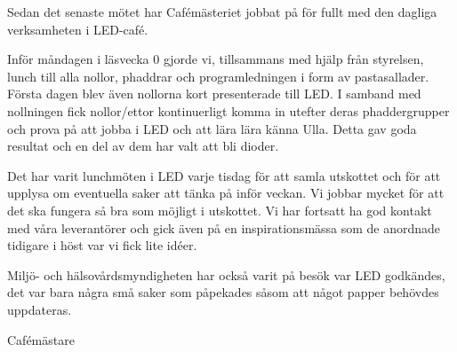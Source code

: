\documentclass[../_main/handlingar.tex]{subfiles}
\begin{document}

Sedan det senaste mötet har Cafémästeriet jobbat på för fullt med den dagliga verksamheten i LED-café.

Inför måndagen i läsvecka 0 gjorde vi, tillsammans med hjälp från styrelsen, lunch till alla nollor, phaddrar och programledningen i form av pastasallader. Första dagen blev även nollorna kort presenterade till LED. I samband med nollningen fick nollor/ettor kontinuerligt komma in utefter deras phaddergrupper och prova på att jobba i LED och att lära lära känna Ulla. Detta gav goda resultat och en del av dem har valt att bli dioder.

Det har varit lunchmöten i LED varje tisdag för att samla utskottet och för att upplysa om eventuella saker att tänka på inför veckan. Vi jobbar mycket för att det ska fungera så bra som möjligt i utskottet. Vi har fortsatt ha god kontakt med våra leverantörer och gick även på en inspirationsmässa som de anordnade tidigare i höst var vi fick lite idéer.

Miljö- och hälsovårdsmyndigheten har också varit på besök var LED godkändes, det var bara några små saker som påpekades såsom att något papper behövdes uppdateras.

\begin{signatures}{1}
    \mvh
    \signature{Stephanie Mirsky}{Cafémästare}
\end{signatures}
\end{document}
